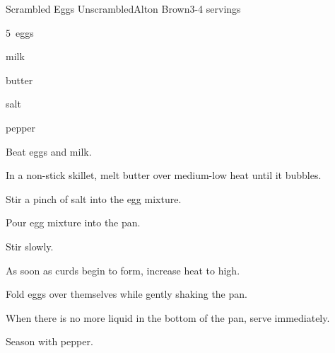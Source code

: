 \begin{recipe}{Scrambled Eggs Unscrambled}{Alton Brown}{3-4 servings}

\begin{ingredients}
\item 5~eggs
\item {} milk
\item butter
\item salt
\item pepper
\end{ingredients}

\begin{directions}
\item Beat eggs and milk.
\item In a non-stick skillet, melt butter over medium-low heat until it bubbles.
\item Stir a pinch of salt into the egg mixture.
\item Pour egg mixture into the pan.
\item Stir slowly.
\item As soon as curds begin to form, increase heat to high.
\item Fold eggs over themselves while gently shaking the pan.
\item When there is no more liquid in the bottom of the pan, serve immediately.
\item Season with pepper.
\end{directions}

\end{recipe}
